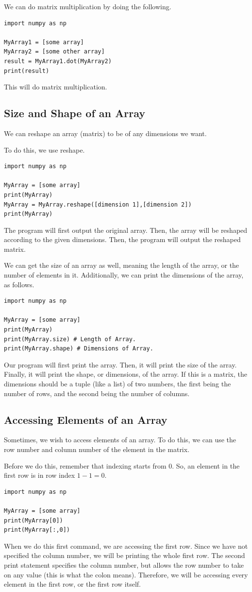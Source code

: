 \documentclass{article}
\begin{document}
We can do matrix multiplication by doing the following. 
\begin{lstlisting}
import numpy as np

MyArray1 = [some array]
MyArray2 = [some other array]
result = MyArray1.dot(MyArray2)
print(result)
\end{lstlisting}
This will do matrix multiplication.
\subsection{Size and Shape of an Array}
We can reshape an array (matrix) to be of any dimensions we want. 

To do this, we use reshape.
\begin{lstlisting}
import numpy as np

MyArray = [some array]
print(MyArray)
MyArray = MyArray.reshape([dimension 1],[dimension 2])
print(MyArray)
\end{lstlisting}
The program will first output the original array. Then, the array will be reshaped according to the given dimensions. Then, the program will output the reshaped matrix.

We can get the size of an array as well, meaning the length of the array, or the number of elements in it. Additionally, we can print the dimensions of the array, as follows.
\begin{lstlisting}
import numpy as np

MyArray = [some array]
print(MyArray)
print(MyArray.size) # Length of Array.
print(MyArray.shape) # Dimensions of Array.
\end{lstlisting}
Our program will first print the array. Then, it will print the size of the array. Finally, it will print the shape, or dimensions, of the array. If this is a matrix, the dimensions should be a tuple (like a list) of two numbers, the first being the number of rows, and the second being the number of columns. 

\subsection{Accessing Elements of an Array}
Sometimes, we wish to access elements of an array. To do this, we can use the row number and column number of the element in the matrix.

Before we do this, remember that indexing starts from 0. So, an element in the first row is in row index $1-1=0$. 
\begin{lstlisting}
import numpy as np

MyArray = [some array]
print(MyArray[0])
print(MyArray[:,0])
\end{lstlisting}
When we do this first command, we are accessing the first row. Since we have not specified the column number, we will be printing the whole first row. The second print statement specifies the column number, but allows the row number to take on any value (this is what the colon means). Therefore, we will be accessing every element in the first row, or the first row itself. 
\end{document}
